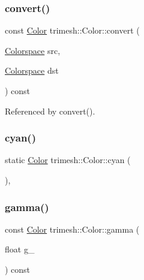 \subsubsection{\texorpdfstring{convert()}{convert()}}
{\footnotesize\ttfamily const \hyperlink{classtrimesh_1_1Color}{Color} trimesh\+::\+Color\+::convert (\begin{DoxyParamCaption}\item[{\hyperlink{classtrimesh_1_1Color_a2e472a2f6056fb5d0d835ee1c361b6da}{Colorspace}}]{src,  }\item[{\hyperlink{classtrimesh_1_1Color_a2e472a2f6056fb5d0d835ee1c361b6da}{Colorspace}}]{dst }\end{DoxyParamCaption}) const\hspace{0.3cm}{\ttfamily [inline]}}



Referenced by convert().

\mbox{\label{classtrimesh_1_1Color_a0fa734079d4c95adee86ef323267ef86}} 
\subsubsection{\texorpdfstring{cyan()}{cyan()}}
{\footnotesize\ttfamily static \hyperlink{classtrimesh_1_1Color}{Color} trimesh\+::\+Color\+::cyan (\begin{DoxyParamCaption}{ }\end{DoxyParamCaption})\hspace{0.3cm}{\ttfamily [inline]}, {\ttfamily [static]}}

\mbox{\label{classtrimesh_1_1Color_a3540c038c7f993120eed3d3683797b02}} 
\subsubsection{\texorpdfstring{gamma()}{gamma()}\hspace{0.1cm}{\footnotesize\ttfamily [1/2]}}
{\footnotesize\ttfamily const \hyperlink{classtrimesh_1_1Color}{Color} trimesh\+::\+Color\+::gamma (\begin{DoxyParamCaption}\item[{float}]{g\+\_\+ }\end{DoxyParamCaption}) const\hspace{0.3cm}{\ttfamily [inline]}}

